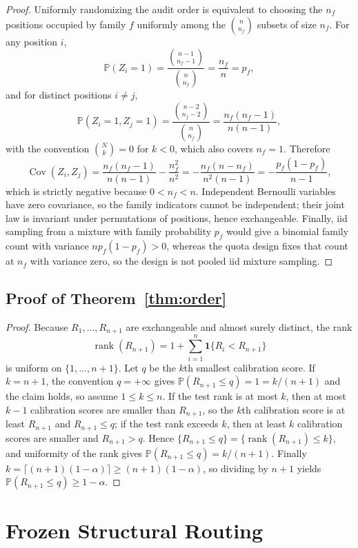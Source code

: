 \documentclass[10pt,twocolumn]{article}
\newcounter{algorithm}
\newcommand{\Pp}{\mathbb{P}}
\begin{document}
\begin{proof}
Uniformly randomizing the audit order is equivalent to choosing the $n_f$
positions occupied by family $f$ uniformly among the $\binom{n}{n_f}$ subsets of
size $n_f$.  For any position $i$,
\[
 \Pp(Z_i=1)=\frac{\binom{n-1}{n_f-1}}{\binom{n}{n_f}}=\frac{n_f}{n}=p_f ,
\]
and for distinct positions $i\ne j$,
\[
 \Pp(Z_i=1,Z_j=1)=\frac{\binom{n-2}{n_f-2}}{\binom{n}{n_f}}
 =\frac{n_f(n_f-1)}{n(n-1)} ,
\]
with the convention $\binom{N}{k}=0$ for $k<0$, which also covers $n_f=1$.
Therefore
\[
 \operatorname{Cov}(Z_i,Z_j)
 =\frac{n_f(n_f-1)}{n(n-1)}-\frac{n_f^2}{n^2}
 =-\frac{n_f(n-n_f)}{n^2(n-1)}
 =-\frac{p_f(1-p_f)}{n-1} ,
\]
which is strictly negative because $0<n_f<n$.  Independent Bernoulli variables
have zero covariance, so the family indicators cannot be independent; their joint
law is invariant under permutations of positions, hence exchangeable.  Finally,
iid sampling from a mixture with family probability $p_f$ would give a binomial
family count with variance $np_f(1-p_f)>0$, whereas the quota design fixes that
count at $n_f$ with variance zero, so the design is not pooled iid mixture
sampling.
\end{proof}

\subsection{Proof of Theorem~\ref{thm:order}}
\label{app:proof-order}

\begin{proof}
Because $R_1,\dots,R_{n+1}$ are exchangeable and almost surely distinct, the rank
\[
 \operatorname{rank}(R_{n+1})=1+\sum_{i=1}^{n}\mathbf 1\{R_i<R_{n+1}\}
\]
is uniform on $\{1,\dots,n+1\}$.  Let $q$ be the $k$th smallest calibration
score.  If $k=n+1$, the convention $q=+\infty$ gives
$\Pp(R_{n+1}\le q)=1=k/(n+1)$ and the claim holds, so assume $1\le k\le n$.  If
the test rank is at most $k$, then at most $k-1$ calibration scores are smaller
than $R_{n+1}$, so the $k$th calibration score is at least $R_{n+1}$ and
$R_{n+1}\le q$; if the test rank exceeds $k$, then at least $k$ calibration
scores are smaller and $R_{n+1}>q$.  Hence
$\{R_{n+1}\le q\}=\{\operatorname{rank}(R_{n+1})\le k\}$, and uniformity of the
rank gives $\Pp(R_{n+1}\le q)=k/(n+1)$.  Finally
$k=\lceil(n+1)(1-\alpha)\rceil\ge(n+1)(1-\alpha)$, so dividing by $n+1$ yields
$\Pp(R_{n+1}\le q)\ge1-\alpha$.
\end{proof}

\section{Frozen Structural Routing}
\label{app:algorithm}
\end{document}
